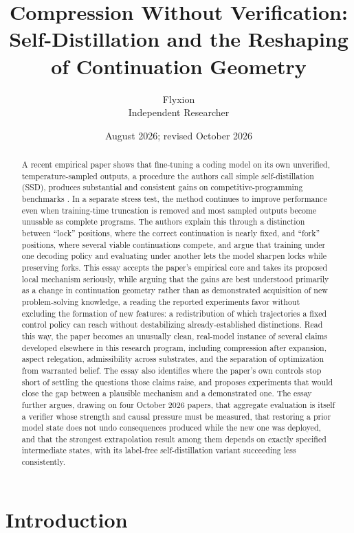 \documentclass[11pt]{article}
\title{\textbf{Compression Without Verification: Self-Distillation and the Reshaping of Continuation Geometry}}
\author{Flyxion \\ \small Independent Researcher}
\date{August 2026; revised October 2026}
\begin{document}
\maketitle

\begin{abstract}
A recent empirical paper shows that fine-tuning a coding model on its own unverified, temperature-sampled outputs, a procedure the authors call simple self-distillation (SSD), produces substantial and consistent gains on competitive-programming benchmarks \cite{zhang2026ssd}. In a separate stress test, the method continues to improve performance even when training-time truncation is removed and most sampled outputs become unusable as complete programs. The authors explain this through a distinction between ``lock'' positions, where the correct continuation is nearly fixed, and ``fork'' positions, where several viable continuations compete, and argue that training under one decoding policy and evaluating under another lets the model sharpen locks while preserving forks. This essay accepts the paper's empirical core and takes its proposed local mechanism seriously, while arguing that the gains are best understood primarily as a change in continuation geometry rather than as demonstrated acquisition of new problem-solving knowledge, a reading the reported experiments favor without excluding the formation of new features: a redistribution of which trajectories a fixed control policy can reach without destabilizing already-established distinctions. Read this way, the paper becomes an unusually clean, real-model instance of several claims developed elsewhere in this research program, including compression after expansion, aspect relegation, admissibility across substrates, and the separation of optimization from warranted belief. The essay also identifies where the paper's own controls stop short of settling the questions those claims raise, and proposes experiments that would close the gap between a plausible mechanism and a demonstrated one. The essay further argues, drawing on four October 2026 papers, that aggregate evaluation is itself a verifier whose strength and causal pressure must be measured, that restoring a prior model state does not undo consequences produced while the new one was deployed, and that the strongest extrapolation result among them depends on exactly specified intermediate states, with its label-free self-distillation variant succeeding less consistently.
\end{abstract}

\section{Introduction}
\end{document}
